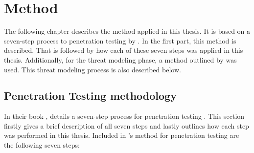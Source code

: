 \chapter{Method} \label{ch:method}
The following chapter describes the method applied in this thesis. It is based on a seven-step process to penetration testing by \textcite{weidman2014}. In the first part, this method is described. That is followed by how each of these seven steps was applied in this thesis. Additionally, for the threat modeling phase, a method outlined by \textcite{guzman2017iot} was used. This threat modeling process is also described below.

\section{Penetration Testing methodology} \label{ch:method:pentest}
In their book , \citeauthor{weidman2014} details a seven-step process for penetration testing \cite{weidman2014}. This section firstly gives a brief description of all seven steps and lastly outlines how each step was performed in this thesis. Included in \citeauthor{weidman2014}'s method for penetration testing are the following seven steps:
